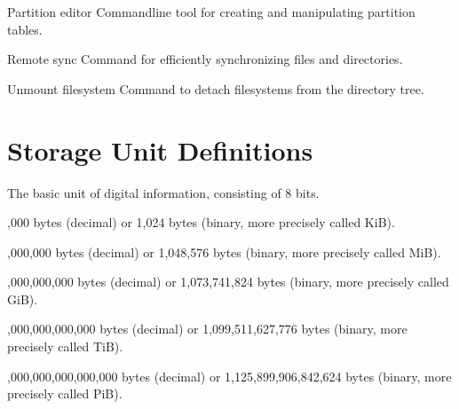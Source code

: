 \documentclass[letterpaper,10pt,english]{sphinxmanual}
\begin{document}
\begin{description}
\sphinxAtStartPar
Partition editor \sphinxhyphen{} Command\sphinxhyphen{}line tool for creating and manipulating partition tables.

\sphinxAtStartPar
Remote sync \sphinxhyphen{} Command for efficiently synchronizing files and directories.

\sphinxAtStartPar
Unmount filesystem \sphinxhyphen{} Command to detach filesystems from the directory tree.

\end{description}


\chapter{Storage Unit Definitions}
\label{\detokenize{glossary:storage-unit-definitions}}\begin{description}
\sphinxAtStartPar
The basic unit of digital information, consisting of 8 bits.

,000 bytes (decimal) or 1,024 bytes (binary, more precisely called KiB).

,000,000 bytes (decimal) or 1,048,576 bytes (binary, more precisely called MiB).

,000,000,000 bytes (decimal) or 1,073,741,824 bytes (binary, more precisely called GiB).

,000,000,000,000 bytes (decimal) or 1,099,511,627,776 bytes (binary, more precisely called TiB).

,000,000,000,000,000 bytes (decimal) or 1,125,899,906,842,624 bytes (binary, more precisely called PiB).

\end{description}
\end{document}
